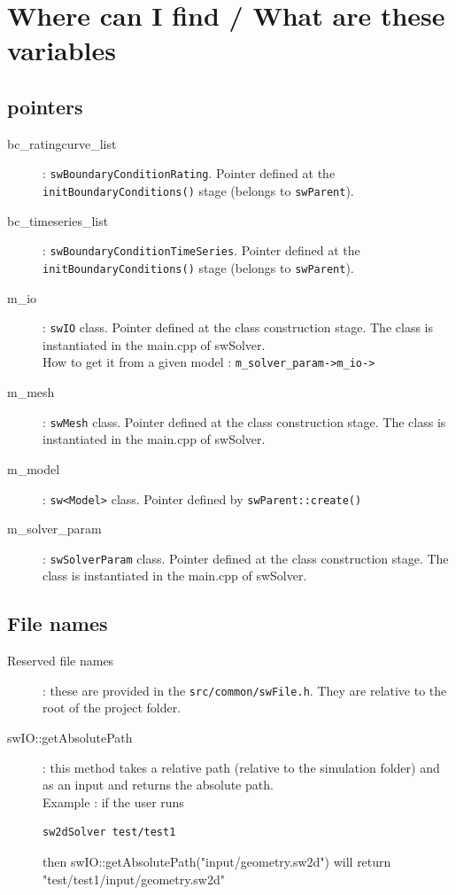 \section{Where can I find / What are these variables}
\subsection{pointers}
\begin{description}
\item [bc\_ratingcurve\_list]: \texttt{swBoundaryConditionRating}. Pointer defined at the \texttt{initBoundaryConditions()} stage (belongs to \texttt{swParent}).
\item [bc\_timeseries\_list]: \texttt{swBoundaryConditionTimeSeries}. Pointer defined at the \texttt{initBoundaryConditions()} stage (belongs to \texttt{swParent}).
\item [m\_io] : \texttt{swIO} class. Pointer defined at the class construction stage. The class is instantiated in the main.cpp of swSolver. \\
How to get it from a given model : \texttt{m\_solver\_param->m\_io->}
\item [m\_mesh] : \texttt{swMesh} class. Pointer defined at the class construction stage. The class is instantiated in the main.cpp of swSolver.
\item [m\_model]: \texttt{sw<Model>} class. Pointer defined by \texttt{swParent::create()}
\item [m\_solver\_param] : \texttt{swSolverParam} class. Pointer defined at the class construction stage. The class is instantiated in the main.cpp of swSolver. 
\end{description}
\subsection{File names}
\begin{description}
\item [Reserved file names]: these are provided in the \texttt{src/common/swFile.h}. They are relative to the root of the project folder.
\item [swIO::getAbsolutePath]: this method takes a relative path (relative to the simulation folder) and as an input and returns the absolute path.\\
Example : if the user runs 
\begin{verbatim}
sw2dSolver test/test1
\end{verbatim}
then swIO::getAbsolutePath("input/geometry.sw2d") will return "test/test1/input/geometry.sw2d"
\end{description}
